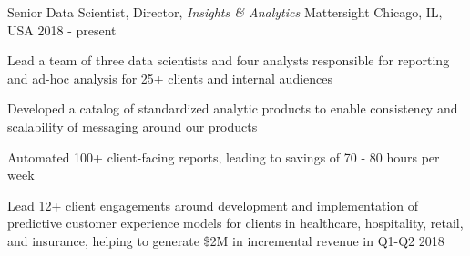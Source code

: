 
\begin{cventries}

 \cventry
    {Senior Data Scientist, Director, \textit{Insights \& Analytics}} %
    {Mattersight} %
    {Chicago, IL, USA} %
    {2018 - present} %
    {
      \begin{cvitems}
        \item {Lead a team of three data scientists and four analysts responsible for reporting and ad-hoc analysis for 25+ clients and internal audiences}
        \item {Developed a catalog of standardized analytic products to enable consistency and scalability of messaging around our products}
        \item {Automated 100+ client-facing reports, leading to savings of 70 - 80 hours per week}
        \item {Lead 12+ client engagements around development and implementation of predictive customer experience models for clients in healthcare, hospitality, retail, and insurance, helping to generate \$2M in incremental revenue in Q1-Q2 2018}
      \end{cvitems}
      }


\end{cventries}
